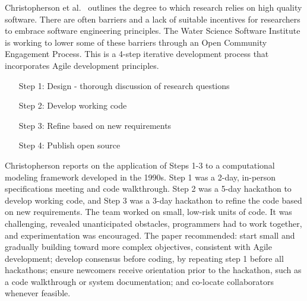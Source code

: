 \documentclass[11pt, oneside]{amsart}
\begin{document}


Christopherson et al.~\cite{Christopherson_WSSSPE} outlines the degree to which research relies on high
quality software. There are often barriers and a lack of suitable incentives
for researchers to embrace software engineering principles. The Water Science
Software Institute is working to lower some of these barriers through an Open
Community Engagement Process. This is a 4-step iterative development process
that incorporates Agile development principles.

\begin{itemize}
\setlength{\itemindent}{0.5in}
\item[Step 1:] Design - thorough discussion of research questions
\item[Step 2:] Develop working code
\item[Step 3:] Refine based on new requirements
\item[Step 4:] Publish open source
\end{itemize}

Christopherson reports on the application of Steps 1-3 to a
computational modeling framework developed in the 1990s. Step 1 was
a 2-day, in-person specifications meeting and code walkthrough. Step 2 was a
5-day hackathon to develop working code, and Step 3 was a 3-day hackathon to refine
the code based on new requirements. The team worked on small, low-risk units of
code. It was challenging, revealed unanticipated obstacles, programmers had to
work together, and experimentation was encouraged.
%
The paper recommended: start small and gradually building toward more complex
objectives, consistent with Agile development; develop consensus before
coding, by repeating step 1 before all hackathons; ensure newcomers
receive orientation prior to the hackathon, such as a code
walkthrough or system documentation; and co-locate collaborators
whenever feasible.

\end{document}
